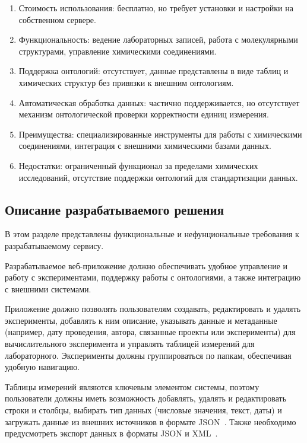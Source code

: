 \begin{enumerate}
    \item Стоимость использования: бесплатно, но требует установки и настройки на собственном сервере.
    \item Функциональность: ведение лабораторных записей, работа с молекулярными структурами, управление химическими соединениями.
    \item Поддержка онтологий: отсутствует, данные представлены в виде таблиц и химических структур без привязки к внешним онтологиям.
    \item Автоматическая обработка данных: частично поддерживается, но отсутствует механизм онтологической проверки корректности единиц измерения.
    \item Преимущества: специализированные инструменты для работы с химическими соединениями, интеграция с внешними химическими базами данных.
    \item Недостатки: ограниченный функционал за пределами химических исследований, отсутствие поддержки онтологий для стандартизации данных.
\end{enumerate}

\subsection{Описание разрабатываемого решения}

В этом разделе представлены функциональные и нефунциональные требования к разрабатываемому сервису.

Разрабатываемое веб-приложение должно обеспечивать удобное управление и работу с экспериментами, поддержку работы с онтологиями, а также интеграцию с внешними системами.

Приложение должно позволять пользователям создавать, редактировать и удалять эксперименты, добавлять к ним описание, указывать данные и метаданные (например, дату проведения, автора, связанные проекты или эксперименты) для вычислительного эксперимента и управлять таблицей измерений для лабораторного.
Эксперименты должны группироваться по папкам, обеспечивая удобную навигацию.

Таблицы измерений являются ключевым элементом системы, поэтому пользователи должны иметь возможность добавлять, удалять и редактировать строки и столбцы, выбирать тип данных (числовые значения, текст, даты) и загружать данные из внешних источников в формате JSON~\cite{Format:JSON}.
Также необходимо предусмотреть экспорт данных в форматы JSON и XML~\cite{Format:XML}.

